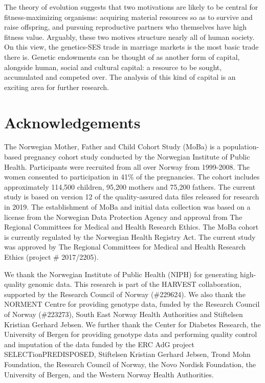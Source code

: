 \documentclass[
  12pt,
]{article}
\theoremstyle{definition}
\theoremstyle{definition}
\theoremstyle{definition}
\theoremstyle{definition}
\theoremstyle{remark}
\begin{document}
The theory of evolution suggests that two motivations are likely to be
central for fitness-maximizing organisms: acquiring material resources
so as to survive and raise offspring, and pursuing reproductive partners
who themselves have high fitness value. Arguably, these two motives
structure nearly all of human society. On this view, the genetics-SES
trade in marriage markets is the most basic trade there is. Genetic
endowments can be thought of as another form of capital, alongside
human, social and cultural capital: a resource to be sought, accumulated
and competed over. The analysis of this kind of capital is an exciting
area for further research.

\section{Acknowledgements}\label{acknowledgements}

The Norwegian Mother, Father and Child Cohort Study (MoBa) is a
population-based pregnancy cohort study conducted by the Norwegian
Institute of Public Health. Participants were recruited from all over
Norway from 1999-2008. The women consented to participation in 41\% of
the pregnancies. The cohort includes approximately 114,500 children,
95,200 mothers and 75,200 fathers. The current study is based on version
12 of the quality-assured data files released for research in 2019. The
establishment of MoBa and initial data collection was based on a license
from the Norwegian Data Protection Agency and approval from The Regional
Committees for Medical and Health Research Ethics. The MoBa cohort is
currently regulated by the Norwegian Health Registry Act. The current
study was approved by The Regional Committees for Medical and Health
Research Ethics (project \# 2017/2205).

We thank the Norwegian Institute of Public Health (NIPH) for generating
high-quality genomic data. This research is part of the HARVEST
collaboration, supported by the Research Council of Norway (\#229624). We
also thank the NORMENT Centre for providing genotype data, funded by the
Research Council of Norway (\#223273), South East Norway Health
Authorities and Stiftelsen Kristian Gerhard Jebsen. We further thank the
Center for Diabetes Research, the University of Bergen for providing
genotype data and performing quality control and imputation of the data
funded by the ERC AdG project SELECTionPREDISPOSED, Stiftelsen Kristian
Gerhard Jebsen, Trond Mohn Foundation, the Research Council of Norway,
the Novo Nordisk Foundation, the University of Bergen, and the Western
Norway Health Authorities.
\end{document}
